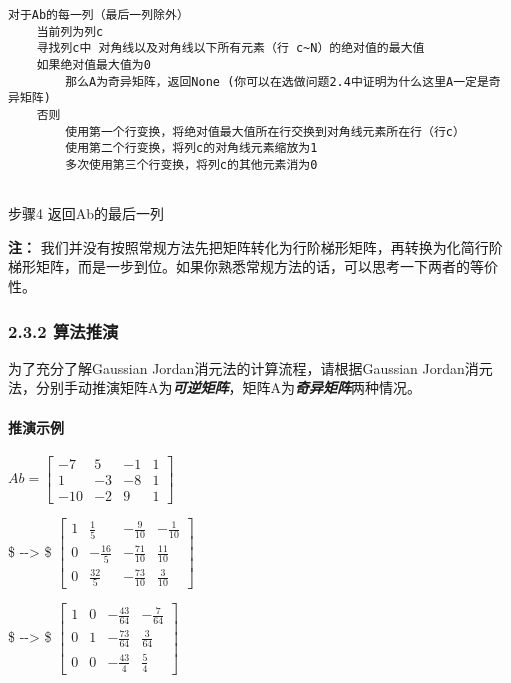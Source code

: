 \documentclass[11pt]{article}
\begin{document}
\begin{verbatim}
对于Ab的每一列（最后一列除外）
    当前列为列c
    寻找列c中 对角线以及对角线以下所有元素（行 c~N）的绝对值的最大值
    如果绝对值最大值为0
        那么A为奇异矩阵，返回None (你可以在选做问题2.4中证明为什么这里A一定是奇异矩阵)
    否则
        使用第一个行变换，将绝对值最大值所在行交换到对角线元素所在行（行c） 
        使用第二个行变换，将列c的对角线元素缩放为1
        多次使用第三个行变换，将列c的其他元素消为0
        
\end{verbatim}

步骤4 返回Ab的最后一列

\textbf{注：}
我们并没有按照常规方法先把矩阵转化为行阶梯形矩阵，再转换为化简行阶梯形矩阵，而是一步到位。如果你熟悉常规方法的话，可以思考一下两者的等价性。

    \subsubsection{2.3.2 算法推演}\label{ux7b97ux6cd5ux63a8ux6f14}

为了充分了解Gaussian Jordan消元法的计算流程，请根据Gaussian
Jordan消元法，分别手动推演矩阵A为\textbf{\emph{可逆矩阵}}，矩阵A为\textbf{\emph{奇异矩阵}}两种情况。

    \paragraph{推演示例}\label{ux63a8ux6f14ux793aux4f8b}

\(Ab = \begin{bmatrix}  -7 & 5 & -1 & 1\\  1 & -3 & -8 & 1\\  -10 & -2 & 9 & 1\end{bmatrix}\)

\$ -\/-\textgreater{} \$
\(\begin{bmatrix}  1 & \frac{1}{5} & -\frac{9}{10} & -\frac{1}{10}\\  0 & -\frac{16}{5} & -\frac{71}{10} & \frac{11}{10}\\  0 & \frac{32}{5} & -\frac{73}{10} & \frac{3}{10}\end{bmatrix}\)

\$ -\/-\textgreater{} \$
\(\begin{bmatrix}  1 & 0 & -\frac{43}{64} & -\frac{7}{64}\\  0 & 1 & -\frac{73}{64} & \frac{3}{64}\\  0 & 0 & -\frac{43}{4} & \frac{5}{4}\end{bmatrix}\)
\end{document}
